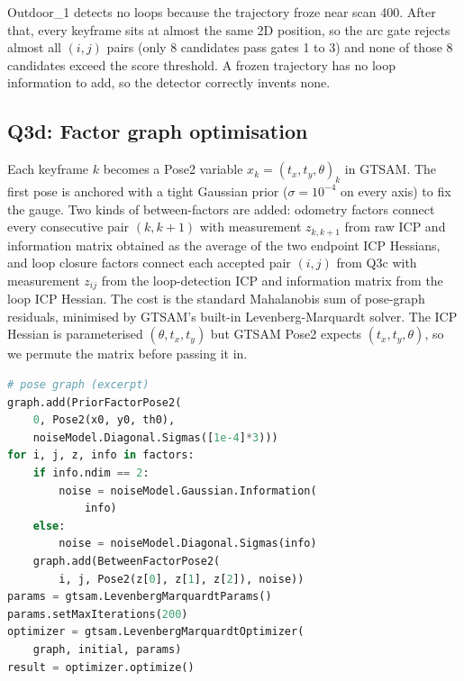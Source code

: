 \documentclass[twocolumn,10pt,a4paper]{article}
\begin{document}
Outdoor\_1 detects no loops because the trajectory froze near scan
400. After that, every keyframe sits at almost the same 2D position,
so the arc gate rejects almost all $(i, j)$ pairs (only 8 candidates
pass gates 1 to 3) and none of those 8 candidates exceed the score
threshold. A frozen trajectory has no loop information to add, so the
detector correctly invents none.

\subsection{Q3d: Factor graph optimisation}
\label{sec:q3d}

Each keyframe $k$ becomes a Pose2 variable
$x_k = (t_x, t_y, \theta)_k$ in GTSAM. The first pose is anchored
with a tight Gaussian prior ($\sigma = 10^{-4}$ on every axis) to
fix the gauge. Two kinds of between-factors are added: odometry
factors connect every consecutive pair $(k, k+1)$ with measurement
$z_{k,k+1}$ from raw ICP and information matrix obtained as the
average of the two endpoint ICP Hessians, and loop closure factors
connect each accepted pair $(i, j)$ from Q3c with measurement
$z_{ij}$ from the loop-detection ICP and information matrix from the
loop ICP Hessian. The cost is the standard Mahalanobis sum of
pose-graph residuals, minimised by GTSAM's built-in
Levenberg-Marquardt solver. The ICP Hessian
is parameterised $(\theta, t_x, t_y)$ but GTSAM Pose2 expects
$(t_x, t_y, \theta)$, so we permute the matrix before passing it in.

\begin{lstlisting}[language=Python]
# pose graph (excerpt)
graph.add(PriorFactorPose2(
    0, Pose2(x0, y0, th0),
    noiseModel.Diagonal.Sigmas([1e-4]*3)))
for i, j, z, info in factors:
    if info.ndim == 2:
        noise = noiseModel.Gaussian.Information(
            info)
    else:
        noise = noiseModel.Diagonal.Sigmas(info)
    graph.add(BetweenFactorPose2(
        i, j, Pose2(z[0], z[1], z[2]), noise))
params = gtsam.LevenbergMarquardtParams()
params.setMaxIterations(200)
optimizer = gtsam.LevenbergMarquardtOptimizer(
    graph, initial, params)
result = optimizer.optimize()
\end{lstlisting}

\begin{table}[H]
\centering\footnotesize
\caption{Q3d closure error before and after PGO.}
\label{tab:q3d}
\end{table}
\end{document}
